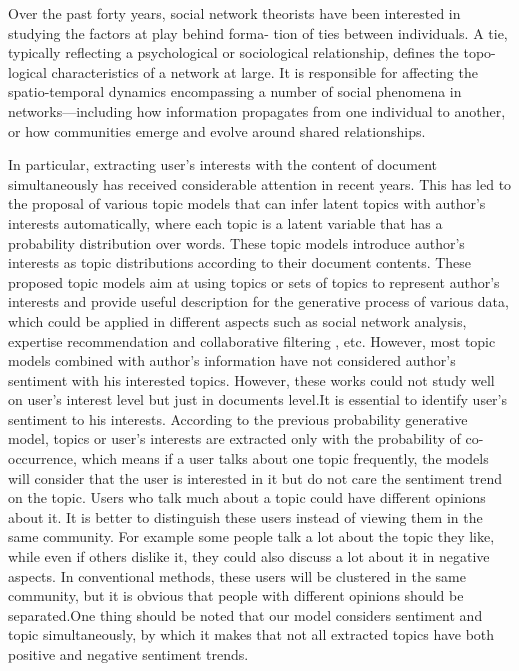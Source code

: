 \documentclass[twocolumn]{svjour3}          %
\begin{document}
Over the past forty years, social network theorists have
been interested in studying the factors at play behind forma- tion of ties between individuals. A tie, typically reflecting a psychological or sociological relationship, defines the topo- logical characteristics of a network at large. It is responsible for affecting the spatio-temporal dynamics encompassing a number of social phenomena in networks—including how information propagates from one individual to another, or how communities emerge and evolve around shared relationships.

In particular, extracting user’s interests with the content of document simultaneously has received considerable attention in recent years. This has led to the proposal of various topic models that can infer latent topics with author’s interests automatically, where each topic is a latent variable that has a probability distribution over words. These topic models introduce author’s interests as topic distributions according to their document contents. These proposed topic models aim at using topics or sets of topics to represent author’s interests and provide useful description for the generative process of various data, which could be applied in different aspects such as social network analysis, expertise recommendation  and collaborative filtering , etc. \cite{zhao2012user}
However, most topic models combined with author’s information have not considered author’s sentiment with his interested topics.
However, these works could not study well on user’s interest level but just in documents level.It is essential to identify user’s sentiment to his interests. According to the previous probability generative model, topics or user’s interests are extracted only with the probability of co-occurrence, which means if a user talks about one topic frequently, the models will consider that the user is interested in it but do not care the sentiment trend on the topic. Users who talk much about a topic could have different opinions about it. It is better to distinguish these users instead of viewing them in the same community. For example some people talk a lot about the topic they like, while even if others dislike it, they could also discuss a lot about it in negative aspects. In conventional methods, these users will be clustered in the same community, but it is obvious that people with different opinions should be separated.One thing should be noted that our model considers sentiment and topic simultaneously, by which it makes that not all extracted topics have both positive and negative sentiment trends.
\end{document}
